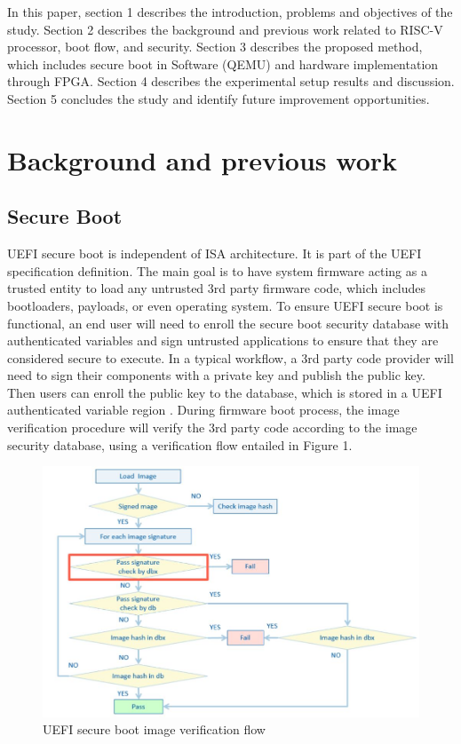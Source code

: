 \documentclass[review]{elsarticle}
\begin{document}
In this paper, section 1 describes the introduction, problems and objectives of the study.
Section 2 describes the background and previous work related to RISC-V processor, boot flow, and
security. Section 3 describes the proposed method, which includes secure boot in Software (QEMU)
and hardware implementation through FPGA. Section 4 describes the experimental setup results and
discussion. Section 5 concludes the study and identify future improvement opportunities.


\section{ Background and previous work}


\subsection{Secure Boot}
UEFI secure boot is independent of ISA architecture. It is part of the UEFI specification definition. The main goal is to have system firmware acting as a trusted entity to load any untrusted 3rd party firmware code, which includes bootloaders, payloads, or even operating system. To ensure UEFI secure boot is functional, an end user will need to enroll the secure boot security database with authenticated variables and sign untrusted applications to ensure that they are considered secure to execute.
In a typical workflow, a 3rd party code provider will need to sign their components with a private key and publish the public key. Then users can enroll the public key to the database, which is stored in a UEFI authenticated variable region \cite{R5:13}.  During firmware boot process, the image verification procedure will verify the 3rd party code according to the image security database, using a verification flow entailed in Figure 1.


\begin{figure}[H]
	\centering
	\includegraphics[width=1\textwidth]{figs/UefiSecureBootImageVerificationFlow.JPG}
	\caption{UEFI secure boot image verification flow \cite{R5:13}}
\end{figure}
\end{document}
